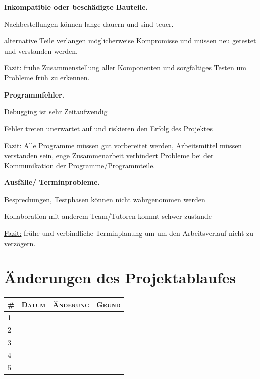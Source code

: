 \documentclass[lang=ngerman,inputenc=utf8,fontsize=10pt]{ldvarticle}
\begin{document}
\textbf{Inkompatible oder beschädigte Bauteile.}
\begin{list}{->}{}
\item Nachbestellungen können lange dauern und sind teuer.
\item alternative Teile verlangen möglicherweise Kompromisse und müssen neu getestet und verstanden werden.
\end{list}
\underline{Fazit:} frühe Zusammenstellung aller Komponenten und sorgfältiges Testen um Probleme früh zu erkennen.


\textbf{Programmfehler.}
\begin{list}{->}{}
\item Debugging ist sehr Zeitaufwendig
\item Fehler treten unerwartet auf und riskieren den Erfolg des Projektes
\end{list}

\underline{Fazit:} Alle Programme müssen gut vorbereitet werden, Arbeitsmittel müssen verstanden sein, enge Zusammenarbeit verhindert Probleme bei der Kommunikation der Programme/Programmteile.


\textbf{Ausfälle/ Terminprobleme.}
\begin{list}{->}{}
\item Besprechungen, Testphasen können nicht wahrgenommen werden
\item Kollaboration mit anderem Team/Tutoren kommt schwer zustande
\end{list}
\underline{Fazit:} frühe und verbindliche Terminplanung um um den Arbeitsverlauf nicht zu verzögern.


\section{Änderungen des Projektablaufes}



\begin{tabular}[htbp]{|p{}||p{}|p{}|p{}|}
	\hline
	\textsc{\#} & \textsc{Datum} & \textsc{Änderung} & \textsc{Grund} \\
	\hline
	\hline
	1 & & & \\[1em]
	\hline
	2 & & & \\[1em]
	\hline
	3 & & & \\[1em]
	\hline
	4 & & & \\[1em]
	\hline
	5 & & & \\[1em]
	\hline
\end{tabular}
\end{document}
